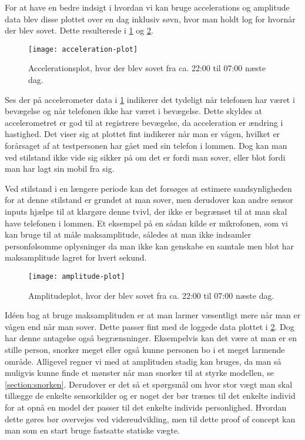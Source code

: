 For at have en bedre indsigt i hvordan vi kan bruge accelerations og amplitude data blev disse plottet over en dag inklusiv søvn, hvor man holdt log for hvornår der blev sovet.
Dette resulterede i \cref{fig:accplot} og \cref{fig:amplplot}.

\begin{figure}[h]
	\centering
	\texttt{[image: acceleration-plot]}
	\caption{Accelerationsplot, hvor der blev sovet fra ca. 22:00 til 07:00 næste dag.}\label{fig:accplot}
\end{figure}

Ses der på accelerometer data i \cref{fig:accplot} indikerer det tydeligt når telefonen har været i bevægelse og når telefonen ikke har været i bevægelse.
Dette skyldes at accelerometret er god til at registrere bevægelse, da acceleration er ændring i hastighed.
Det viser sig at plottet fint indikerer når man er vågen, hvilket er forårsaget af at testpersonen har gået med sin telefon i lommen.
Dog kan man ved stilstand ikke vide sig sikker på om det er fordi man sover, eller blot fordi man har lagt sin mobil fra sig.

Ved stilstand i en længere periode kan det forsøges at estimere sandsynligheden for at denne stilstand er grundet at man sover, men derudover kan andre sensor inputs hjælpe til at klargøre denne tvivl, der ikke er begrænset til at man skal have telefonen i lommen.
Et eksempel på en sådan kilde er mikrofonen, som vi kan bruge til at måle maksamplitude, således at man ikke indsamler personfølsomme oplysninger da man ikke kan genskabe en samtale men blot har maksamplitude lagret for hvert sekund.

\begin{figure}[h]
	\centering
	\texttt{[image: amplitude-plot]}
	\caption{Amplitudeplot, hvor der blev sovet fra ca. 22:00 til 07:00 næste dag.}\label{fig:amplplot}
\end{figure}

Idéen bag at bruge maksamplituden er at man larmer væsentligt mere når man er vågen end når man sover.
Dette passer fint med de loggede data plottet i \cref{fig:amplplot}.
Dog har denne antagelse også begrænsninger.
Eksempelvis kan det være at man er en stille person, snorker meget eller også kunne personen bo i et meget larmende område.
Alligevel regner vi med at amplituden stadig kan bruges, da man så muligvis kunne finde et mønster når man snorker til at styrke modellen, se \cref{section:snorken}.
Derudover er det så et spørgsmål om hvor stor vægt man skal tillægge de enkelte sensorkilder og er noget der bør trænes til det enkelte individ for at opnå en model der passer til det enkelte individs personlighed.
Hvordan dette gøres bør overvejes ved videreudvikling, men til dette proof of concept kan man som en start bruge fastsatte statiske vægte.

